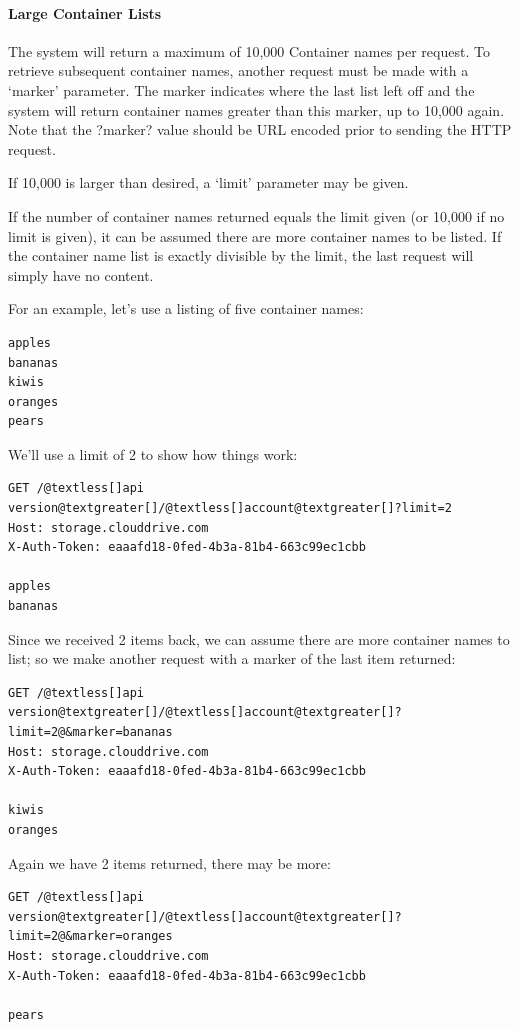 \documentclass[letterpaper,10pt,english]{manual}
\begin{document}
\paragraph{Large Container Lists}

The system will return a maximum of 10,000 Container names per request.
To retrieve subsequent container names, another request must be made with
a `marker' parameter. The marker indicates where the last list left off
and the system will return container names greater than this marker, up to
10,000 again.  Note that the ?marker? value should be URL encoded prior to
sending the HTTP request.

If 10,000 is larger than desired, a `limit' parameter may be given.

If the number of container names returned equals the limit given (or
10,000 if no limit is given), it can be assumed there are more container
names to be listed. If the container name list is exactly divisible by the
limit, the last request will simply have no content.

For an example, let's use a listing of five container names:

\begin{Verbatim}[commandchars=@\[\]]
apples
bananas
kiwis
oranges
pears
\end{Verbatim}

We'll use a limit of 2 to show how things work:

\begin{Verbatim}[commandchars=@\[\]]
GET /@textless[]api version@textgreater[]/@textless[]account@textgreater[]?limit=2
Host: storage.clouddrive.com
X-Auth-Token: eaaafd18-0fed-4b3a-81b4-663c99ec1cbb

apples
bananas
\end{Verbatim}

Since we received 2 items back, we can assume there are more container
names to list; so we make another request with a marker of the last item
returned:

\begin{Verbatim}[commandchars=@\[\]]
GET /@textless[]api version@textgreater[]/@textless[]account@textgreater[]?limit=2@&marker=bananas
Host: storage.clouddrive.com
X-Auth-Token: eaaafd18-0fed-4b3a-81b4-663c99ec1cbb

kiwis
oranges
\end{Verbatim}

Again we have 2 items returned, there may be more:

\begin{Verbatim}[commandchars=@\[\]]
GET /@textless[]api version@textgreater[]/@textless[]account@textgreater[]?limit=2@&marker=oranges
Host: storage.clouddrive.com
X-Auth-Token: eaaafd18-0fed-4b3a-81b4-663c99ec1cbb

pears
\end{Verbatim}
\end{document}
